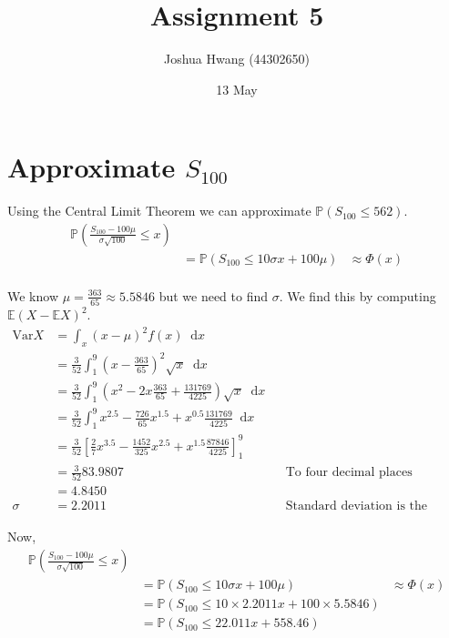 \documentclass{article}
\title{Assignment 5}
\author{Joshua Hwang (44302650)}
\date{13 May}
\newcommand{\diff}{\mathop{}\!\mathrm{d}}
\newcommand{\prob}{\mathbb{P}}
\newcommand{\expect}{\mathbb{E}}
\begin{document}
\maketitle

\section{Approximate $S_{100}$}
Using the Central Limit Theorem we can approximate $\prob(S_{100} \leq 562)$.
\begin{align*}
    \prob \left( \frac{S_{100} - 100\mu}{\sigma \sqrt{100}} \leq x \right) \\
    &= \prob \left( S_{100} \leq 10 \sigma x + 100\mu \right) &\approx \Phi(x) \\
\end{align*}

We know $\mu = \frac{363}{65} \approx 5.5846$ but we need to find $\sigma$.
We find this by computing $\expect (X - \expect X)^2$.
\begin{align*}
    \text{Var} X &= \int_x (x - \mu)^2 f(x) \diff x \\
    &= \frac{3}{52} \int_1^9 (x - \frac{363}{65})^2 \sqrt{x} \diff x \\
    &= \frac{3}{52} \int_1^9
    \left( x^2 - 2x\frac{363}{65} + \frac{131769}{4225} \right)
    \sqrt{x} \diff x \\
    &= \frac{3}{52} \int_1^9
    x^{2.5} - \frac{726}{65}x^{1.5} + x^{0.5}\frac{131769}{4225} \diff x \\
    &= \frac{3}{52} \left[
    \frac{2}{7}x^{3.5} - \frac{1452}{325}x^{2.5} + x^{1.5}\frac{87846}{4225}
    \right]_1^9 \\
    &= \frac{3}{52} 83.9807 && \text{To four decimal places} \\
    &= 4.8450 \\
    \sigma &= 2.2011
    && \text{Standard deviation is the square root of Variance}
\end{align*}

Now,
\begin{align*}
    \prob \left( \frac{S_{100} - 100\mu}{\sigma \sqrt{100}} \leq x \right) \\
    &= \prob \left( S_{100} \leq 10 \sigma x + 100\mu \right) &\approx \Phi(x) \\
    &= \prob \left( S_{100} \leq 10 \times 2.2011 x + 100 \times 5.5846 \right) \\
    &= \prob \left( S_{100} \leq 22.011 x + 558.46 \right)
\end{align*}
\end{document}
